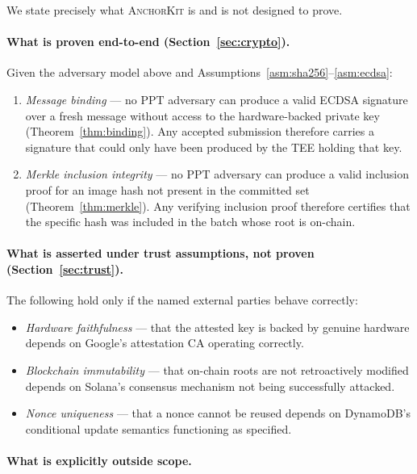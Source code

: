 \documentclass[11pt,a4paper]{article}
\newcommand{\ppt}{\mathrm{PPT}}
\newcommand{\AK}{\textsc{AnchorKit}\xspace}
\begin{document}
We state precisely what \AK is and is not designed to prove.

\paragraph{What is proven end-to-end (Section~\ref{sec:crypto}).} Given the
adversary model above and Assumptions~\ref{asm:sha256}--\ref{asm:ecdsa}:

\begin{enumerate}[label=\arabic*.]
  \item \emph{Message binding} --- no $\ppt$ adversary can produce a valid
    ECDSA signature over a fresh message without access to the hardware-backed
    private key (Theorem~\ref{thm:binding}).  Any accepted submission therefore
    carries a signature that could only have been produced by the TEE holding
    that key.
  \item \emph{Merkle inclusion integrity} --- no $\ppt$ adversary can produce
    a valid inclusion proof for an image hash not present in the committed set
    (Theorem~\ref{thm:merkle}).  Any verifying inclusion proof therefore
    certifies that the specific hash was included in the batch whose root is
    on-chain.
\end{enumerate}

\paragraph{What is asserted under trust assumptions, not proven
(Section~\ref{sec:trust}).} The following hold only if the named external
parties behave correctly:

\begin{itemize}
  \item \emph{Hardware faithfulness} --- that the attested key is backed by
    genuine hardware depends on Google's attestation CA operating correctly.
  \item \emph{Blockchain immutability} --- that on-chain roots are not
    retroactively modified depends on Solana's consensus mechanism not being
    successfully attacked.
  \item \emph{Nonce uniqueness} --- that a nonce cannot be reused depends on
    DynamoDB's conditional update semantics functioning as specified.
\end{itemize}

\paragraph{What is explicitly outside scope.}
\end{document}
